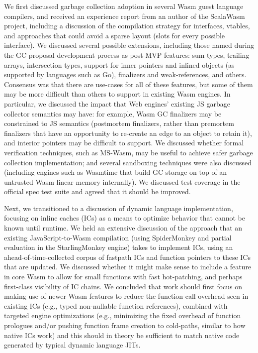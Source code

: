 \documentclass[a4paper,UKenglish]{dagrep-v2018}
\begin{document}
We first discussed garbage collection adoption in several Wasm guest language
compilers, and received an experience report from an author of the ScalaWasm
project, including a discussion of the compilation strategy for interfaces,
vtables, and approaches that could avoid a sparse layout (slots for every
possible interface). We discussed several possible extensions, including those
named during the GC proposal development process as post-MVP features: sum
types, trailing arrays, intersection types, support for inner pointers and
inlined objects (as supported by languages such as Go), finalizers and
weak-references, and others. Consensus was that there are use-cases for all of
these features, but some of them may be more difficult than others to support
in existing Wasm engines. In particular, we discussed the impact that Web
engines' existing JS garbage collector semantics may have: for example, Wasm GC
finalizers may be constrained to JS semantics (postmortem finalizers, rather
than premortem finalizers that have an opportunity to re-create an edge to an
object to retain it), and interior pointers may be difficult to support. We
discussed whether formal verification techniques, such as MS-Wasm, may be
useful to achieve safer garbage collection implementation; and several
sandboxing techniques were also discussed (including engines such as Wasmtime
that build GC storage on top of an untrusted Wasm linear memory internally). We
discussed test coverage in the official spec test suite and agreed that it
should be improved.

Next, we transitioned to a discussion of dynamic language implementation,
focusing on inline caches (ICs) as a means to optimize behavior that cannot be
known until runtime. We held an extensive discussion of the approach that an
existing JavaScript-to-Wasm compilation (using SpiderMonkey and partial
evaluation in the StarlingMonkey engine) takes to implement ICs, using an
ahead-of-time-collected corpus of fastpath ICs and function pointers to these
ICs that are updated. We discussed whether it might make sense to include a
feature in core Wasm to allow for small functions with fast hot-patching, and
perhaps first-class visibility of IC chains. We concluded that work should
first focus on making use of newer Wasm features to reduce the function-call
overhead seen in existing ICs (e.g., typed non-nullable function references),
combined with targeted engine optimizations (e.g., minimizing the fixed
overhead of function prologues and/or pushing function frame creation to
cold-paths, similar to how native ICs work) and this should in theory be
sufficient to match native code generated by typical dynamic language JITs.
\end{document}
